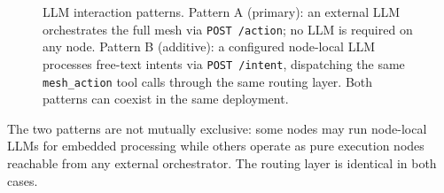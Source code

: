 \documentclass[10pt,twocolumn]{article}
\begin{document}
\begin{figure}[tp]
{
}%
\caption{LLM interaction patterns. Pattern A (primary): an external LLM
orchestrates the full mesh via \texttt{POST /action}; no LLM is
required on any node. Pattern B (additive): a configured node-local LLM
processes free-text intents via \texttt{POST /intent}, dispatching the
same \texttt{mesh\_action} tool calls through the same routing layer.
Both patterns can coexist in the same deployment.}
\label{fig:dual}
\end{figure}

The two patterns are not mutually exclusive: some nodes may run
node-local LLMs for embedded processing while others operate as pure
execution nodes reachable from any external orchestrator.
The routing layer is identical in both cases.
\end{document}
